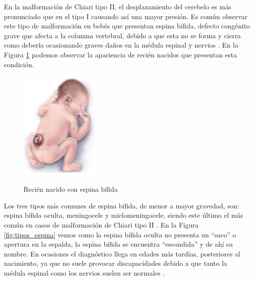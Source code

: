 En la malformación de Chiari tipo II, el desplazamiento del cerebelo es más pronunciado que en el tipo I causando así una mayor presión. Es común observar este tipo de malformación en bebés que presentan espina bífida, defecto congénito grave que afecta a la columna vertebral, debido a que esta no se forma y cierra como debería ocasionando graves daños en la médula espinal y nervios \cite{chiari_t2}. En la Figura \ref{fig:bebe_espina} podemos observar la apariencia de recién nacidos que presentan esta condición. 
\begin{figure}[h]
    \centering
    \includegraphics[width=0.35\textwidth]{img/bebe_espina.PNG}
    \caption{Recién nacido con espina bífida}
    \cite{espina_bifida}
    \label{fig:bebe_espina}
\end{figure}

Los tres tipos más comunes de espina bífida, de menor a mayor gravedad, son: espina bífida oculta, meningocele y mielomeningocele, siendo este último el más común en casos de malformación de Chiari tipo II \cite{mayo_chiari}. En la Figura \ref{fig:tipos_espina} vemos como la espina bífida oculta no presenta un “saco” o apertura en la espalda, la espina bífida se encuentra “escondida” y de ahí su nombre. En ocasiones el diagnóstico llega en edades más tardías, posteriores al nacimiento, ya que no suele provocar discapacidades debido a que tanto la médula espinal como los nervios suelen ser normales \cite{cdc_espina_bifida}. 

